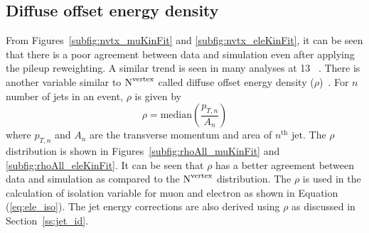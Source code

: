 \subsection{Diffuse offset energy density}
From Figures~\ref{subfig:nvtx_muKinFit} and \ref{subfig:nvtx_eleKinFit}, it can be seen that there 
is a poor agreement between data and simulation even after applying the pileup reweighting.
A similar trend is seen in many analyses at 13 \TeV~\cite{CMS-AN-17-003, CMS-AN-17-116}. There 
is another variable similar to $\rm{N}^{\text{vertex}}$ called diffuse offset energy density
($\rho$)~\cite{Cacciari:2005hq, Cacciari:2011ma}. For $n$ number of jets in an event, $\rho$ is 
given by~\cite{Cacciari:2007fd}
\begin{equation}
    \rho = {\text{median}}\left(\frac{p_{T, n}}{A_n}\right)
    \label{eq:rho}
\end{equation}
where $p_{T,n}$ and $A_n$ are the transverse momentum and area of $n^{\text{th}}$ jet.
The $\rho$ distribution is shown in Figures~\ref{subfig:rhoAll_muKinFit} and \ref{subfig:rhoAll_eleKinFit}. It can be seen that $\rho$ has a better agreement between data and simulation as compared to the 
$\rm{N}^{\text{vertex}}$ distribution. The $\rho$ is used in the calculation of isolation variable for 
muon and electron as shown in Equation (\ref{eq:ele_iso}). The jet energy corrections are also 
derived using $\rho$ as discussed in Section~\ref{ss:jet_id}.

